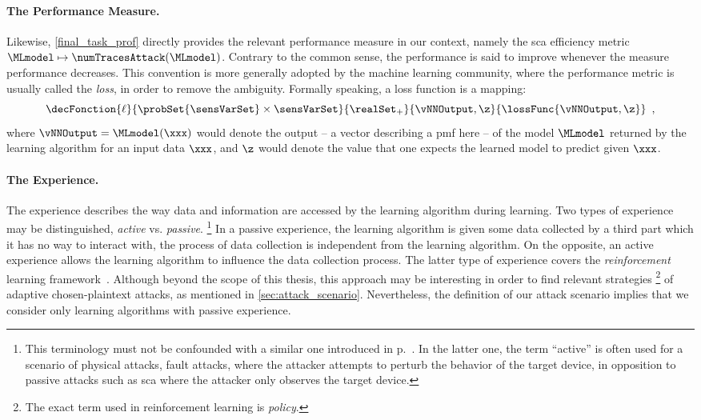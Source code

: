 \paragraph{The Performance Measure.}
Likewise, \autoref{final_task_prof} directly provides the relevant performance measure in our context, namely the \gls{sca} efficiency metric \(\MLmodel \mapsto \numTracesAttack(\MLmodel)\).
Contrary to the common sense, the performance is said to improve whenever the measure performance decreases.
This convention is more generally adopted by the machine learning community, where the performance metric is usually called the \emph{loss}, in order to remove the ambiguity.
Formally speaking, a loss function is a mapping:
\begin{equation}
	\decFonction{\ell}{\probSet{\sensVarSet} \times \sensVarSet}{\realSet_+}{\vNNOutput, \z}{\lossFunc{\vNNOutput, \z}} \enspace ,
	\label{eq:loss_function}
\end{equation}
where \(\vNNOutput = \MLmodel(\xxx)\) would denote the output -- \ie{} a vector describing a \gls{pmf} here -- of the model \(\MLmodel\) returned by the learning algorithm for an input data \(\xxx\), and \(\z\) would denote the value that one expects the learned model to predict given \(\xxx\).

\paragraph{The Experience.} 
The experience describes the way data and information are accessed by the learning algorithm during learning.
Two types of experience may be distinguished, \aka{} \emph{active} vs. \emph{passive}.%
\footnote{
	This terminology must not be confounded with a similar one introduced in p.~\pageref{ref_passive_active}.
	In the latter one, the term ``active'' is often used for a scenario of physical attacks, \eg{} fault attacks, where the attacker attempts to perturb the behavior of the target device, in opposition to passive attacks such as \gls{sca} where the attacker only observes the target device.
}
In a passive experience, the learning algorithm is given some data collected by a third part which it has no way to interact with, \ie{} the process of data collection is independent from the learning algorithm.
On the opposite, an active experience allows the learning algorithm to influence the data collection process.
The latter type of experience covers the \emph{reinforcement} learning framework~\cite{sutton_reinforcement_1998}.
Although beyond the scope of this thesis, this approach may be interesting in order to find relevant strategies%
\footnote{
	The exact term used in reinforcement learning is \emph{policy}.
}
of adaptive chosen-plaintext attacks, as mentioned in \autoref{sec:attack_scenario}.
Nevertheless, the definition of our attack scenario implies that we consider only learning algorithms with passive experience.


